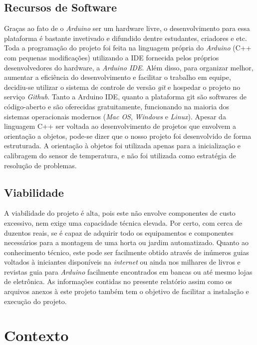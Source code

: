 \documentclass[a4paper,12pt]{article}
\begin{document}
\subsection{Recursos de Software}

Graças ao fato de o \textit{Arduino} ser um hardware livre, o desenvolvimento para essa plataforma é bastante invetivado e difundido dentre estudantes, criadores e etc. Toda a programação do projeto foi feita na linguagem própria do \textit{Arduino} (C++ com pequenas modificações) utilizando a IDE fornecida pelos próprios desenvolvedores do hardware, a \textit{Arduino IDE}. Além disso, para organizar melhor, aumentar a eficiência do desenvolvimento e facilitar o trabalho em equipe, decidiu-se utilizar o sistema de controle de versão \textit{git} e hospedar o projeto no serviço \textit{Github}. Tanto a Arduino IDE, quanto a plataforma git são softwares de código-aberto e são oferecidas gratuitamente, funcionando na maioria dos sistemas operacionais modernos (\textit{Mac OS}, \textit{Windows} e \textit{Linux}).
    Apesar da linguagem C++ ser voltada ao desenvolvimento de projetos que envolvem a orientação a objetos, pode-se dizer que o nosso projeto foi desenvolvido de forma estruturada. A orientação à objetos foi utilizada apenas para a inicialização e calibragem do sensor de temperatura, e não foi utilizada como estratégia de resolução de problemas.


\subsection{Viabilidade}

A viabilidade do projeto é alta, pois este não envolve componentes de custo excessivo, nem exige uma capacidade técnica elevada. Por certo, com cerca de duzentos reais, se é capaz de adquirir todo os equipamentos e componentes necessários para a montagem de uma horta ou jardim automatizado. Quanto ao conhecimento técnico, este pode ser facilmente obtido através de inúmeros guias voltados à iniciantes disponíveis na \textit{internet} ou ainda nos milhares de livros e revistas guia para \textit{Arduino} facilmente encontrados em bancas ou até mesmo lojas de eletrônica. As informações contidas no presente relatório assim como os arquivos anexos à este projeto também tem o objetivo de facilitar a instalação e execução do projeto.


\newpage
\section{Contexto}
\end{document}
